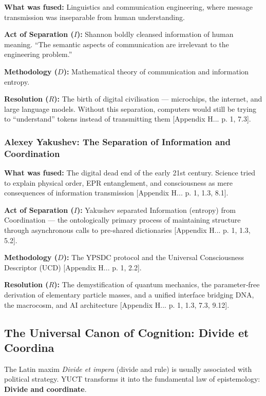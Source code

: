 \documentclass[12pt,a4paper]{article}
\begin{document}
	\textbf{What was fused:} Linguistics and communication engineering, where message transmission was inseparable from human understanding.
	
	\textbf{Act of Separation (\(I\)):} Shannon boldly cleansed information of human meaning. “The semantic aspects of communication are irrelevant to the engineering problem.”
	
	\textbf{Methodology (\(D\)):} Mathematical theory of communication and information entropy.
	
	\textbf{Resolution (\(R\)):} The birth of digital civilisation — microchips, the internet, and large language models. Without this separation, computers would still be trying to “understand” tokens instead of transmitting them [Appendix H... p. 1, 7.3].
	
	\subsubsection{Alexey Yakushev: The Separation of Information and Coordination}
	
	\textbf{What was fused:} The digital dead end of the early 21st century. Science tried to explain physical order, EPR entanglement, and consciousness as mere consequences of information transmission [Appendix H... p. 1, 1.3, 8.1].
	
	\textbf{Act of Separation (\(I\)):} Yakushev separated Information (entropy) from Coordination — the ontologically primary process of maintaining structure through asynchronous calls to pre‑shared dictionaries [Appendix H... p. 1, 1.3, 5.2].
	
	\textbf{Methodology (\(D\)):} The YPSDC protocol and the Universal Consciousness Descriptor (UCD) [Appendix H... p. 1, 2.2].
	
	\textbf{Resolution (\(R\)):} The demystification of quantum mechanics, the parameter‑free derivation of elementary particle masses, and a unified interface bridging DNA, the macrocosm, and AI architecture [Appendix H... p. 1, 1.3, 7.3, 9.12].
	
	\subsection{The Universal Canon of Cognition: Divide et Coordina}
	
	The Latin maxim \emph{Divide et impera} (divide and rule) is usually associated with political strategy. YUCT transforms it into the fundamental law of epistemology: \textbf{Divide and coordinate}.
	
\end{document}

